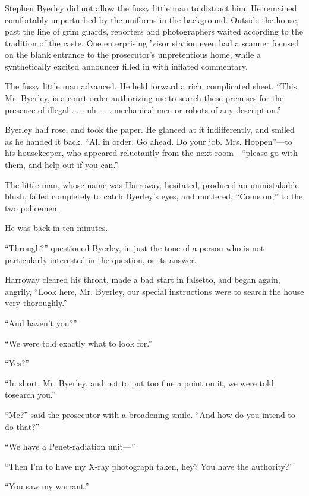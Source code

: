 \documentclass[10pt,a5paper,twoside]{book}
\begin{document}
\subsubsection*{}
Stephen Byerley did not allow the fussy little man to distract him. He remained comfortably unperturbed by the uniforms in the background. Outside the house, past the line of grim guards, reporters and photographers waited according to the tradition of the caste. One enterprising ’visor station even had a scanner focused on the blank entrance to the prosecutor’s unpretentious home, while a synthetically excited announcer filled in with inflated commentary.

The fussy little man advanced. He held forward a rich, complicated sheet. “This, Mr. Byerley, is a court order authorizing me to search these premises for the presence of illegal . . . uh . . . mechanical men or robots of any description.”

Byerley half rose, and took the paper. He glanced at it indifferently, and smiled as he handed it back. “All in order. Go ahead. Do your job. Mrs. Hoppen”—to his housekeeper, who appeared reluctantly from the next room—“please go with them, and help out if you can.”

The little man, whose name was Harroway, hesitated, produced an unmistakable blush, failed completely to catch Byerley’s eyes, and muttered, “Come on,” to the two policemen.

He was back in ten minutes.

“Through?” questioned Byerley, in just the tone of a person who is not particularly interested in the question, or its answer.

Harroway cleared his throat, made a bad start in falsetto, and began again, angrily, “Look here, Mr. Byerley, our special instructions were to search the house very thoroughly.”

“And haven’t you?”

“We were told exactly what to look for.”

“Yes?”

“In short, Mr. Byerley, and not to put too fine a point on it, we were told tosearch you.”

“Me?” said the prosecutor with a broadening smile. “And how do you intend to do that?”

“We have a Penet-radiation unit—”

“Then I’m to have my X-ray photograph taken, hey? You have the authority?”

“You saw my warrant.”
\end{document}
